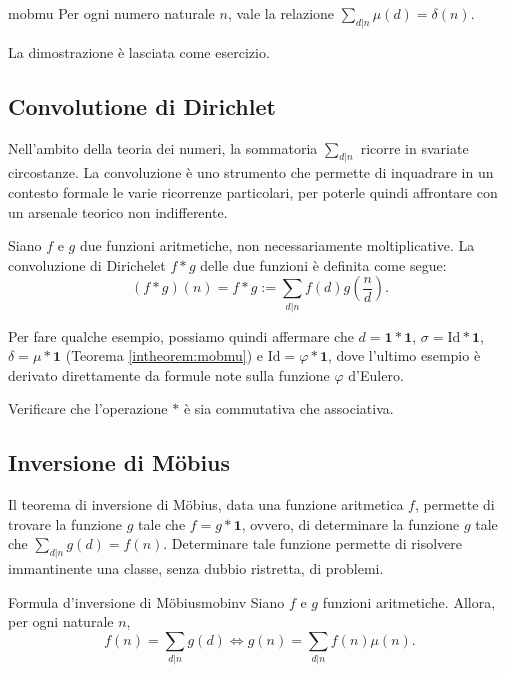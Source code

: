 \documentclass{article}
\begin{document}
\begin{intheorem}{}{mobmu}
	Per ogni numero naturale $n$, vale la relazione $\sum_{d\vert n}\mu(d)=\delta(n)$.
\end{intheorem}

La dimostrazione è lasciata come esercizio.


\subsection{Convolutione di Dirichlet}
Nell'ambito della teoria dei numeri, la sommatoria $\sum_{d\vert n}$
ricorre in svariate circostanze. La convoluzione è uno strumento
che permette di inquadrare in un contesto formale le varie ricorrenze
particolari, per poterle quindi affrontare con un arsenale teorico
non indifferente.

\begin{definition}
Siano $f$ e $g$ due funzioni aritmetiche, non necessariamente moltiplicative.
La convoluzione di Dirichelet $f\ast g$ delle due funzioni è definita come segue:
\begin{equation*}
	(f\ast g)(n)=f\ast g:=\sum_{d\vert n}f(d)g\left(\frac{n}{d}\right).
\end{equation*}
\end{definition}

Per fare qualche esempio, possiamo quindi affermare che
$d=\textbf{1}\ast\textbf{1}$, $\sigma=\text{Id}\ast\textbf{1}$,
$\delta=\mu\ast\textbf{1}$ (Teorema \ref{intheorem:mobmu}) e
$\text{Id}=\varphi\ast\textbf{1}$, dove l'ultimo esempio è derivato
direttamente da formule note sulla funzione $\varphi$ d'Eulero.

\begin{exercise}
Verificare che l'operazione $\ast$ è sia commutativa che associativa.
\end{exercise}


\subsection{Inversione di Möbius}

Il teorema di inversione di Möbius, data una funzione aritmetica $f$, permette
di trovare la funzione $g$ tale che $f=g\ast\textbf{1}$, ovvero, di determinare
la funzione $g$ tale che $\sum_{d\vert n}g(d)=f(n)$. Determinare tale funzione
permette di risolvere immantinente una classe, senza dubbio ristretta, di problemi.

\begin{theorem}{Formula d'inversione di Möbius}{mobinv}
Siano $f$ e $g$ funzioni aritmetiche. Allora, per ogni naturale $n$,
\begin{equation*}
	f(n)=\sum_{d\vert n}g(d) \iff g(n)=\sum_{d\vert n}f(n)\mu(n).
\end{equation*}
\end{theorem}
\end{document}
